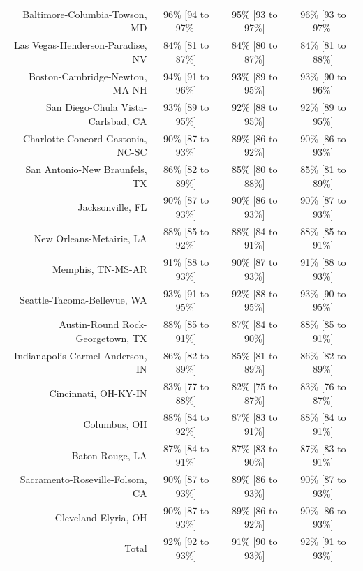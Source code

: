 \documentclass{article}
\begin{document}
\begin{table}[H]
\begin{tabular}{|r|c|c|c|}
		Baltimore-Columbia-Towson, MD & 96\% [94 to 97\%] & 95\% [93 to 97\%] & 96\% [93 to 97\%]\\
		Las Vegas-Henderson-Paradise, NV & 84\% [81 to 87\%] & 84\% [80 to 87\%] & 84\% [81 to 88\%]\\
		Boston-Cambridge-Newton, MA-NH & 94\% [91 to 96\%] & 93\% [89 to 95\%] & 93\% [90 to 96\%]\\
		San Diego-Chula Vista-Carlsbad, CA & 93\% [89 to 95\%] & 92\% [88 to 95\%] & 92\% [89 to 95\%]\\
		Charlotte-Concord-Gastonia, NC-SC & 90\% [87 to 93\%] & 89\% [86 to 92\%] & 90\% [86 to 93\%]\\
		San Antonio-New Braunfels, TX & 86\% [82 to 89\%] & 85\% [80 to 88\%] & 85\% [81 to 89\%]\\
		Jacksonville, FL & 90\% [87 to 93\%] & 90\% [86 to 93\%] & 90\% [87 to 93\%]\\
		New Orleans-Metairie, LA & 88\% [85 to 92\%] & 88\% [84 to 91\%] & 88\% [85 to 91\%]\\
		Memphis, TN-MS-AR & 91\% [88 to 93\%] & 90\% [87 to 93\%] & 91\% [88 to 93\%]\\
		Seattle-Tacoma-Bellevue, WA & 93\% [91 to 95\%] & 92\% [88 to 95\%] & 93\% [90 to 95\%]\\
		Austin-Round Rock-Georgetown, TX & 88\% [85 to 91\%] & 87\% [84 to 90\%] & 88\% [85 to 91\%]\\
		Indianapolis-Carmel-Anderson, IN & 86\% [82 to 89\%] & 85\% [81 to 89\%] & 86\% [82 to 89\%]\\
		Cincinnati, OH-KY-IN & 83\% [77 to 88\%] & 82\% [75 to 87\%] & 83\% [76 to 87\%]\\
		Columbus, OH & 88\% [84 to 92\%] & 87\% [83 to 91\%] & 88\% [84 to 91\%]\\
		Baton Rouge, LA & 87\% [84 to 91\%] & 87\% [83 to 90\%] & 87\% [83 to 91\%]\\
		Sacramento-Roseville-Folsom, CA & 90\% [87 to 93\%] & 89\% [86 to 93\%] & 90\% [87 to 93\%]\\
		Cleveland-Elyria, OH & 90\% [87 to 93\%] & 89\% [86 to 92\%] & 90\% [86 to 93\%]\\
		\hline
		Total & 92\% [92 to 93\%] & 91\% [90 to 93\%] & 92\% [91 to 93\%]\\
		\hline
	\end{tabular}
\end{table}
\end{document}
